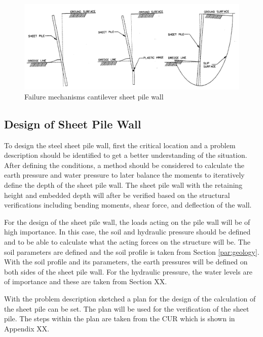\begin{figure}[H]
    \centering
    \includegraphics[width=0.70\linewidth]{figures/ch8/failure_mechanisms.png}
    \caption{Failure mechanisms cantilever sheet pile wall}
    \label{fig:failure_mechanisms_sheetpiles}
\end{figure}


\newpage

\subsection{Design of Sheet Pile Wall}

To design the steel sheet pile wall, first the critical location and a problem description should be identified to get a better understanding of the situation. After defining the conditions, a method should be considered to calculate the earth pressure and water pressure to later balance the moments to iteratively define the depth of the sheet pile wall. The sheet pile wall with the retaining height and embedded depth will after be verified based on the structural verifications including bending moments, shear force, and deflection of the wall. 

For the design of the sheet pile wall, the loads acting on the pile wall will be of high importance. In this case, the soil and hydraulic pressure should be defined and to be able to calculate what the acting forces on the structure will be. The soil parameters are defined and the soil profile is taken from Section \ref{par:geology}. With the soil profile and its parameters, the earth pressures will be defined on both sides of the sheet pile wall. For the hydraulic pressure, the water levels are of importance and these are taken from Section XX. 


With the problem description sketched a plan for the design of the calculation of the sheet pile can be set. The plan will be used for the verification of the sheet pile. The steps within the plan are taken from the CUR which is shown in Appendix XX.

